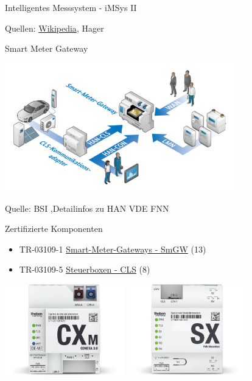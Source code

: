 \begin{frame}{Intelligentes Messsystem - iMSys II}
\begin{center}
\begin{minipage}{0.64\textwidth}
      \end{minipage}
   \end{center}
   Quellen: \href{https://commons.wikimedia.org/wiki/File:2024-SmartMeter.jpg}{Wikipedia}, Hager
\end{frame}

\begin{frame}{Smart Meter Gateway}
   \begin{center}
      \includegraphics[width=10cm]{images/smartmetergateway.png}
   \end{center}
   Quelle: BSI\cite{FFE2020imsys}
   ,Detailinfos zu HAN VDE FNN\cite{VDEFNNimpulsDigitaleSchnittstellen2023}
\end{frame}

\begin{frame}{Zertifizierte Komponenten}
   \begin{itemize}
      \item TR-03109-1 \href{https://www.bsi.bund.de/DE/Themen/Unternehmen-und-Organisationen/Standards-und-Zertifizierung/Smart-metering/Smart-Meter-Gateway/Zertifikate24Msbg/produkte.html}{Smart-Meter-Gateways - SmGW} (13)
      \item TR-03109-5 \href{https://www.bsi.bund.de/DE/Themen/Unternehmen-und-Organisationen/Standards-und-Zertifizierung/Smart-metering/Kommunikationsadapter/Zertifikate/Zertifikate_TR_03109-5_node.html}{Steuerboxen - CLS} (8)
   \end{itemize}
   \vspace{0.3cm}
   \begin{center}
      \includegraphics[height=4cm]{images/Theben_CXm.png}
      \includegraphics[height=4cm]{images/Theben_SX.png}
   \end{center}
\end{frame}


